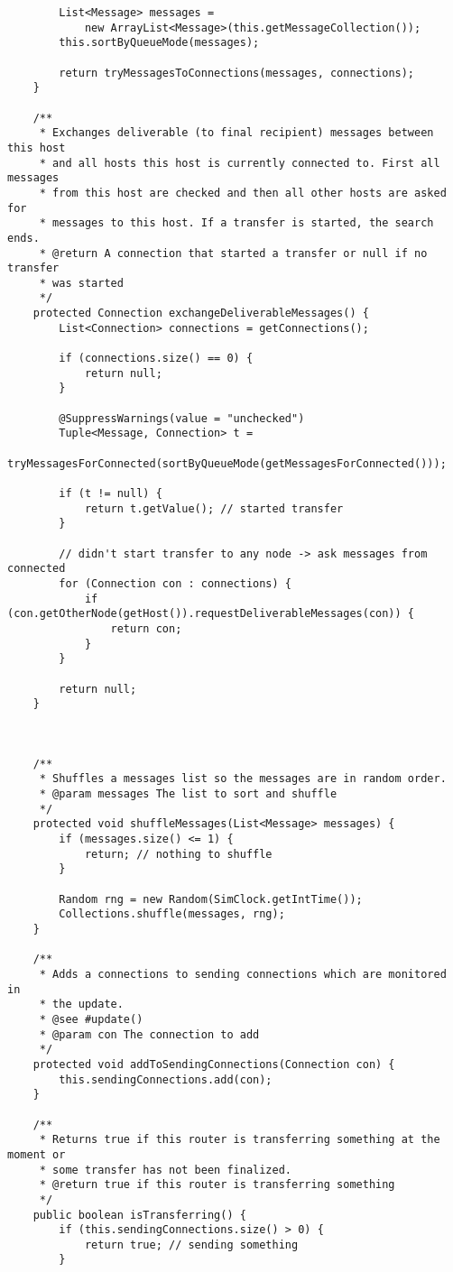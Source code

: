 \documentclass[11pt]{icsthesis}
\begin{document}
\begin{framed}
\begin{verbatim}
		List<Message> messages = 
			new ArrayList<Message>(this.getMessageCollection());
		this.sortByQueueMode(messages);

		return tryMessagesToConnections(messages, connections);
	}
		
	/**
	 * Exchanges deliverable (to final recipient) messages between this host
	 * and all hosts this host is currently connected to. First all messages
	 * from this host are checked and then all other hosts are asked for
	 * messages to this host. If a transfer is started, the search ends.
	 * @return A connection that started a transfer or null if no transfer
	 * was started
	 */
	protected Connection exchangeDeliverableMessages() {
		List<Connection> connections = getConnections();

		if (connections.size() == 0) {
			return null;
		}
		
		@SuppressWarnings(value = "unchecked")
		Tuple<Message, Connection> t =
			tryMessagesForConnected(sortByQueueMode(getMessagesForConnected()));

		if (t != null) {
			return t.getValue(); // started transfer
		}
		
		// didn't start transfer to any node -> ask messages from connected
		for (Connection con : connections) {
			if (con.getOtherNode(getHost()).requestDeliverableMessages(con)) {
				return con;
			}
		}
		
		return null;
	}


	
	/**
	 * Shuffles a messages list so the messages are in random order.
	 * @param messages The list to sort and shuffle
	 */
	protected void shuffleMessages(List<Message> messages) {
		if (messages.size() <= 1) {
			return; // nothing to shuffle
		}
		
		Random rng = new Random(SimClock.getIntTime());
		Collections.shuffle(messages, rng);	
	}
	
	/**
	 * Adds a connections to sending connections which are monitored in
	 * the update.
	 * @see #update()
	 * @param con The connection to add
	 */
	protected void addToSendingConnections(Connection con) {
		this.sendingConnections.add(con);
	}
		
	/**
	 * Returns true if this router is transferring something at the moment or
	 * some transfer has not been finalized.
	 * @return true if this router is transferring something
	 */
	public boolean isTransferring() {
		if (this.sendingConnections.size() > 0) {
			return true; // sending something
		}
		

\end{verbatim}
\end{framed}
\end{document}

